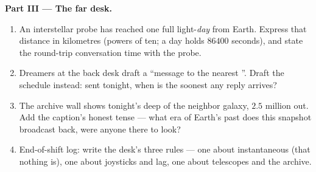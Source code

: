 \begin{problem}
\medskip\noindent\textbf{Part III --- The far desk.}
\begin{enumerate}[resume]
  \item An interstellar probe has reached one full
        light-\emph{day} from Earth. Express that distance
        in kilometres (powers of ten; a day holds $86400$
        seconds), and state the round-trip conversation
        time with the probe.
  \item Dreamers at the back desk draft a ``message to the
        nearest ''. Draft the schedule instead: sent
        tonight, when is the soonest any reply arrives?
  \item The archive wall shows tonight's deep  of the
        neighbor galaxy, $2.5$ million  out. Add
        the caption's honest tense --- what era of Earth's
        past does this snapshot broadcast back, were anyone
        there to look?
  \item End-of-shift log: write the desk's three rules ---
        one about instantaneous (that nothing is), one about
        joysticks and lag, one about telescopes and the
        archive.
\end{enumerate}
\end{problem}
